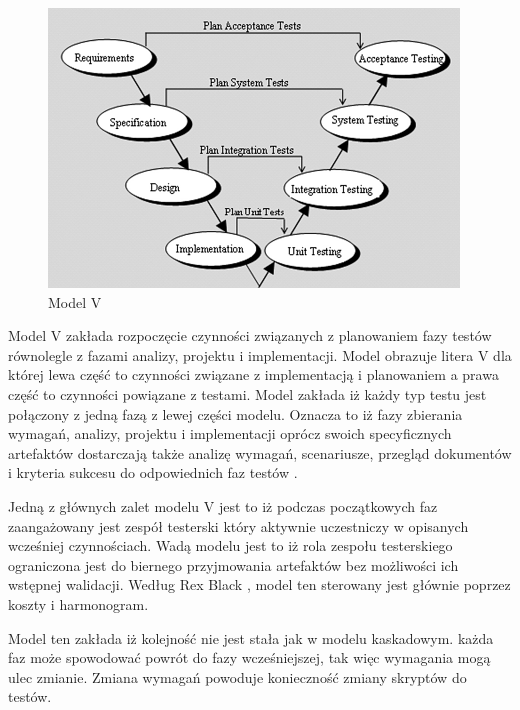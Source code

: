 \begin{figure}[h]
\centerline{\includegraphics[scale=0.5]{img/vmodel.png}}
\caption{Model V \cite{otss}}
\label{fig:vmodel}
\end{figure}
Model V zakłada rozpoczęcie czynności związanych z planowaniem fazy testów równolegle z fazami analizy, projektu i implementacji. Model obrazuje litera V dla której lewa część to czynności związane z implementacją i planowaniem a prawa część to czynności powiązane z testami. Model zakłada iż każdy typ testu jest połączony z jedną fazą z lewej części modelu. Oznacza to iż fazy zbierania wymagań, analizy, projektu i implementacji oprócz swoich specyficznych artefaktów dostarczają także analizę wymagań, scenariusze, przegląd dokumentów i kryteria sukcesu do odpowiednich faz testów \cite{otss}.

Jedną z głównych zalet modelu V jest to iż podczas początkowych faz zaangażowany jest zespół testerski który aktywnie uczestniczy w opisanych wcześniej czynnościach. Wadą modelu jest to iż rola zespołu testerskiego ograniczona jest do biernego przyjmowania artefaktów bez możliwości ich wstępnej walidacji.  Według Rex Black \cite{Fund}, model ten sterowany jest głównie poprzez koszty i harmonogram.

Model ten zakłada iż kolejność nie jest stała jak w modelu kaskadowym. każda  faz może spowodować powrót do fazy wcześniejszej, tak więc wymagania mogą ulec zmianie. Zmiana wymagań powoduje konieczność zmiany skryptów do testów.


